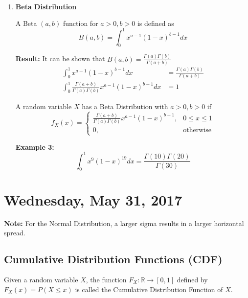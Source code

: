 \documentclass[12pt, twoside]{article}
\begin{document}
\begin{enumerate}
{	}
	\item{
	\textbf{Beta Distribution}\\
	\begin{tcolorbox}[title=Definition: Beta Function]
		A Beta $(a,b)$ function for $a > 0, b > 0$ is defined as
		$$B(a,b) = \int^1_0 x^{a - 1} (1-x)^{b-1} dx$$
	\end{tcolorbox}

	\textbf{Result:} It can be shown that $B(a,b) = \frac{\Gamma (a) \Gamma (b)}{\Gamma (a+b)}$
	\begin{align*}
		\int^1_0 x^{a - 1} (1-x)^{b-1} dx &= \frac{\Gamma (a) \Gamma (b)}{\Gamma (a+b)}\\
		\int^1_0 \frac{\Gamma (a+b)}{\Gamma (a) \Gamma (b)} x^{a - 1} (1-x)^{b-1} dx &= 1
	\end{align*}

	\begin{tcolorbox}[title=Beta Distribution]
		A random variable $X$ has a Beta Distribution with $a > 0, b > 0$ if
		$$f_X (x) = \begin{cases}
		\frac{\Gamma (a+b)}{\Gamma (a) \Gamma (b)} x^{a - 1} (1-x)^{b-1}, & 0 \leq x \leq 1\\
		0, & \text{otherwise}
		\end{cases}
		$$
	\end{tcolorbox}

	\textbf{Example 3:} $$\int^1_0 x^9 (1-x)^{19} dx = \frac{\Gamma (10)\Gamma (20)}{\Gamma (30)}$$

	}
\end{enumerate}

\newpage

\section{Wednesday, May 31, 2017}

\textbf{Note:} For the Normal Distribution, a larger sigma results in a larger horizontal spread.

\subsection{Cumulative Distribution Functions (CDF)}

\begin{tcolorbox}[title=Definition: Cumulative Distribution Functions]
	Given a random variable $X$, the function $F_X : \mathbb{R} \longrightarrow [0,1]$ defined by $F_X (x) = P(X \leq x)$ is called the Cumulative Distribution Function of $X$.
\end{tcolorbox}
\end{document}
